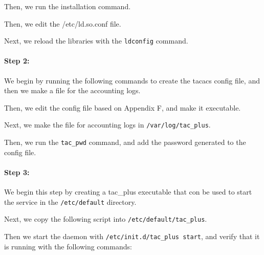 \documentclass[main.tex]{subfiles}
\begin{document}

Then, we run the installation command.


Then, we edit the /etc/ld.so.conf file.


Next, we reload the libraries with the \texttt{ldconfig} command.

\paragraph{Step 2: }
\hfill \break

We begin by running the following commands to create the tacacs config file, and then we make a file for the accounting logs.

Then, we edit the config file based on Appendix F, and make it executable.


Next, we make the file for accounting logs in \texttt{/var/log/tac\_plus}.


Then, we run the \texttt{tac\_pwd} command, and add the password generated to the config file.


\paragraph{Step 3: }
\hfill \break

We begin this step by creating a tac\_plus executable that con be used to start the service in the \texttt{/etc/default} directory.

Next, we copy the following script into \texttt{/etc/default/tac\_plus}.


Then we start the daemon with \texttt{/etc/init.d/tac\_plus start}, and verify that it is running with the following commands:

\end{document}
